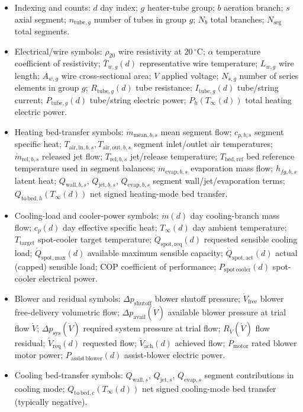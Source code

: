 \documentclass[11pt]{article}
\begin{document}
\begin{itemize}[leftmargin=*]
\item Indexing and counts: \(d\) day index; \(g\) heater-tube group; \(b\) aeration branch; \(s\) axial segment; \(n_{\mathrm{tube},g}\) number of tubes in group \(g\); \(N_b\) total branches; \(N_{\mathrm{seg}}\) total segments.
\item Electrical/wire symbols: \(\rho_{20}\) wire resistivity at \(20\,^\circ\mathrm{C}\); \(\alpha\) temperature coefficient of resistivity; \(\bar T_{w,g}(d)\) representative wire temperature; \(L_{w,g}\) wire length; \(A_{w,g}\) wire cross-sectional area; \(V\) applied voltage; \(N_{s,g}\) number of series elements in group \(g\); \(R_{\mathrm{tube},g}(d)\) tube resistance; \(I_{\mathrm{tube},g}(d)\) tube/string current; \(P_{\mathrm{tube},g}(d)\) tube/string electric power; \(P_h(T_\infty(d))\) total heating electric power.
\item Heating bed-transfer symbols: \(\dot m_{\mathrm{mean},b,s}\) mean segment flow; \(c_{p,b,s}\) segment specific heat; \(T_{\mathrm{air,in},b,s},T_{\mathrm{air,out},b,s}\) segment inlet/outlet air temperatures; \(\dot m_{\mathrm{rel},b,s}\) released jet flow; \(T_{\mathrm{rel},b,s}\) jet/release temperature; \(T_{\mathrm{bed,ref}}\) bed reference temperature used in segment balances; \(\dot m_{\mathrm{evap},b,s}\) evaporation mass flow; \(h_{fg,b,s}\) latent heat; \(Q_{\mathrm{wall},b,s}\), \(Q_{\mathrm{jet},b,s}\), \(Q_{\mathrm{evap},b,s}\) segment wall/jet/evaporation terms; \(Q_{\mathrm{to\,bed},h}(T_\infty(d))\) net signed heating-mode bed transfer.
\item Cooling-load and cooler-power symbols: \(\dot m(d)\) day cooling-branch mass flow; \(c_p(d)\) day effective specific heat; \(T_\infty(d)\) day ambient temperature; \(T_{\mathrm{target}}\) spot-cooler target temperature; \(\dot Q_{\mathrm{spot,req}}(d)\) requested sensible cooling load; \(\dot Q_{\mathrm{spot,max}}(d)\) available maximum sensible capacity; \(\dot Q_{\mathrm{spot,act}}(d)\) actual (capped) sensible load; \(\mathrm{COP}\) coefficient of performance; \(P_{\mathrm{spot\,cooler}}(d)\) spot-cooler electrical power.
\item Blower and residual symbols: \(\Delta p_{\mathrm{shutoff}}\) blower shutoff pressure; \(\dot V_{\mathrm{free}}\) blower free-delivery volumetric flow; \(\Delta p_{\mathrm{avail}}(\dot V)\) available blower pressure at trial flow \(\dot V\); \(\Delta p_{\mathrm{sys}}(\dot V)\) required system pressure at trial flow; \(R_{\dot V}(\dot V)\) flow residual; \(\dot V_{\mathrm{req}}(d)\) requested flow; \(\dot V_{\mathrm{ach}}(d)\) achieved flow; \(P_{\mathrm{motor}}\) rated blower motor power; \(P_{\mathrm{assist\,blower}}(d)\) assist-blower electric power.
\item Cooling bed-transfer symbols: \(Q_{\mathrm{wall},s}\), \(Q_{\mathrm{jet},s}\), \(Q_{\mathrm{evap},s}\) segment contributions in cooling mode; \(Q_{\mathrm{to\,bed},c}(T_\infty(d))\) net signed cooling-mode bed transfer (typically negative).
\end{itemize}
\end{document}
